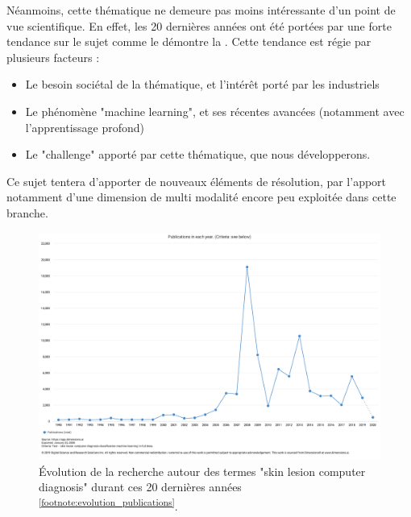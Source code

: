 Néanmoins, cette thématique ne demeure pas moins intéressante d’un point de vue scientifique. En effet, les 20 dernières années ont été portées par une forte tendance sur le sujet comme le démontre la . Cette tendance est régie par plusieurs facteurs :
\begin{itemize}
\item Le besoin sociétal de la thématique, et l'intérêt porté par les industriels
\item Le phénomène "machine learning", et ses récentes avancées (notamment avec l'apprentissage profond)
\item Le "challenge" apporté par cette thématique, que nous développerons.
\end{itemize}\par
Ce sujet tentera d’apporter de nouveaux éléments de résolution, par l’apport notamment d’une dimension de multi modalité encore peu exploitée dans cette branche. 
\begin{figure}[H]
    \centering
    \includegraphics[width=\linewidth]{contents/x_introduction/resources/evolution_publications.pdf}
    \caption{Évolution de la recherche autour des termes "skin lesion computer diagnosis" durant ces 20 dernières années \textsuperscript{\ref{footnote:evolution_publications}}.}
    \label{fig:evolution_publications}
\end{figure}\par
\addtocounter{footnote}{1}
\clearpage